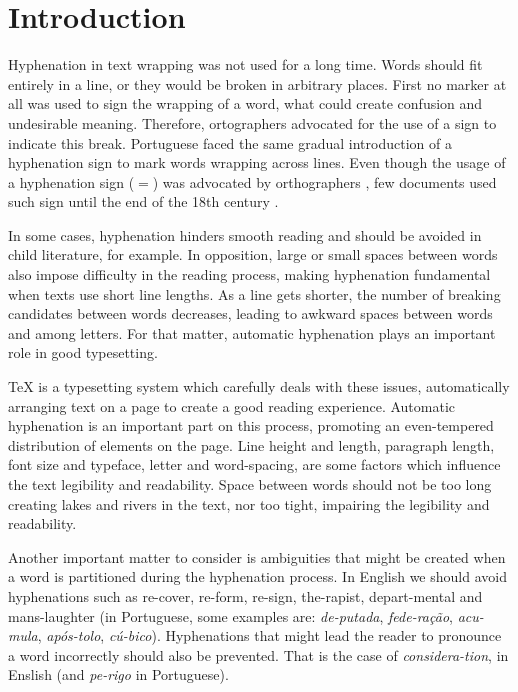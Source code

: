 \documentclass{article}
\begin{document}
\section{Introduction}
Hyphenation in text wrapping was not used for a long time. Words should fit
entirely in a line, or they would be broken in arbitrary places. First no
marker at all was used to sign the wrapping of a word, what could create
confusion and undesirable meaning. Therefore, ortographers advocated for the
use of a sign to indicate this break. Portuguese faced the same gradual
introduction of a hyphenation sign to mark words wrapping across lines. Even
though the usage of a hyphenation sign ($=$) was advocated by orthographers
\cite{gandavo1574}, few documents used such sign until the end of the 18th
century \cite{araujo2015}.

In some cases, hyphenation hinders smooth reading and should be avoided in
child literature, for example. In opposition, large or small spaces between
words also impose difficulty in the reading process, making hyphenation
fundamental when texts use short line lengths. As a line gets shorter, the
number of breaking candidates between words decreases, leading to awkward
spaces between words and among letters. For that matter, automatic hyphenation
plays an important role in good typesetting.


\TeX{} is a typesetting system which carefully deals with these issues,
automatically arranging text on a page to create a good reading experience.
Automatic hyphenation is an important part on this process,
promoting an even-tempered distribution of elements on the page.
Line height and length, paragraph length, font size and typeface,
letter and word-spacing, are some factors which influence the text legibility
and readability. Space between words should not be too long creating lakes and
rivers in the text, nor too tight, impairing the legibility and readability.

Another important matter to consider is ambiguities that might be created when
a word is partitioned during the hyphenation process. In English we should
avoid hyphenations such as re-cover, re-form, re-sign, the-rapist,
depart-mental and mans-laughter (in Portuguese, some examples are:
\emph{de-putada}, \emph{fede-ração}, \emph{acu-mula}, \emph{após-tolo},
\emph{cú-bico}). Hyphenations that might lead the reader to pronounce a word
incorrectly should also be prevented. That is the case of
\emph{considera-tion}, in Enslish (and \emph{pe-rigo} in Portuguese).
\end{document}
